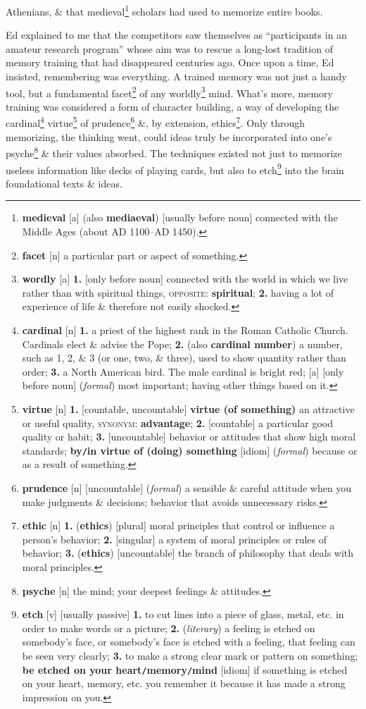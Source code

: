 \documentclass[oneside]{book}
\numberwithin{equation}{section}
\begin{document}
Athenians, \& that medieval\footnote{\textbf{medieval} [a] (also \textbf{mediaeval}) [usually before noun] connected with the Middle Ages (about AD 1100--AD 1450).} scholars had used to memorize entire books.

Ed explained to me that the competitors saw themselves as ``participants in an amateur research program'' whose aim was to rescue a long-lost tradition of memory training that had disappeared centuries ago. Once upon a time, Ed insisted, remembering was everything. A trained memory was not just a handy tool, but a fundamental facet\footnote{\textbf{facet} [n] a particular part or aspect of something.} of any worldly\footnote{\textbf{wordly} [a] \textbf{1.} [only before noun] connected with the world in which we live rather than with spiritual things, \textsc{opposite}: \textbf{spiritual}; \textbf{2.} having a lot of experience of life \& therefore not easily shocked.} mind. What's more, memory training was considered a form of character building, a way of developing the cardinal\footnote{\textbf{cardinal} [n] \textbf{1.} a priest of the highest rank in the Roman Catholic Church. Cardinals elect \& advise the Pope; \textbf{2.} (also \textbf{cardinal number}) a number, such as 1, 2, \& 3 (or one, two, \& three), used to show quantity rather than order; \textbf{3.} a North American bird. The male cardinal is bright red; [a] [only before noun] (\textit{formal}) most important; having other things based on it.} virtue\footnote{\textbf{virtue} [n] \textbf{1.} [countable, uncountable] \textbf{virtue (of something)} an attractive or useful quality, \textsc{synonym}: \textbf{advantage}; \textbf{2.} [countable] a particular good quality or habit; \textbf{3.} [uncountable] behavior or attitudes that show high moral standards; \textbf{by\texttt{/}in virtue of (doing) something} [idiom] (\textit{formal}) because or as a result of something.} of prudence\footnote{\textbf{prudence} [n] [uncountable] (\textit{formal}) a sensible \& careful attitude when you make judgments \& decisions; behavior that avoids unnecessary risks.} \&, by extension, ethics\footnote{\textbf{ethic} [n] \textbf{1.} (\textbf{ethics}) [plural] moral principles that control or influence a person's behavior; \textbf{2.} [singular] a system of moral principles or rules of behavior; \textbf{3.} (\textbf{ethics}) [uncountable] the branch of philosophy that deals with moral principles.}. Only through memorizing, the thinking went, could ideas truly be incorporated into one's psyche\footnote{\textbf{psyche} [n] the mind; your deepest feelings \& attitudes.} \& their values absorbed. The techniques existed not just to memorize useless information like decks of playing cards, but also to etch\footnote{\textbf{etch} [v] [usually passive] \textbf{1.} to cut lines into a piece of glass, metal, etc. in order to make words or a picture; \textbf{2.} (\textit{literary}) a feeling is etched on somebody's face, or somebody's face is etched with a feeling, that feeling can be seen very clearly; \textbf{3.} to make a strong clear mark or pattern on something; \textbf{be etched on your heart\texttt{/}memory\texttt{/}mind} [idiom] if something is etched on your heart, memory, etc. you remember it because it has made a strong impression on you.} into the brain foundational texts \& ideas.
\end{document}
